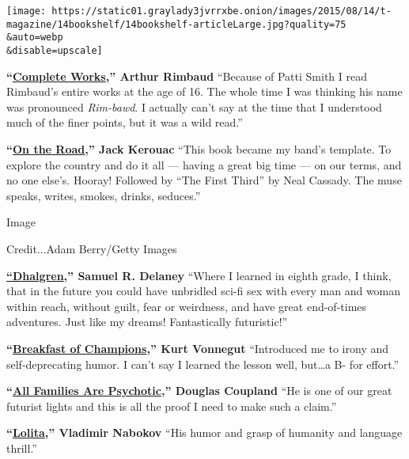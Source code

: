 \texttt{[image: https://static01.graylady3jvrrxbe.onion/images/2015/08/14/t-magazine/14bookshelf/14bookshelf-articleLarge.jpg?quality=75\\\&auto=webp\\\&disable=upscale]}

\textbf{``}\href{http://www.amazon.com/Arthur-Rimbaud-Complete-Works/dp/0061561770}{\textbf{Complete
Works}}\textbf{,'' Arthur Rimbaud} ``Because of Patti Smith I read
Rimbaud's entire works at the age of 16. The whole time I was thinking
his name was pronounced \emph{Rim-bawd}. I actually can't say at the
time that I understood much of the finer points, but it was a wild
read.''

\textbf{``}\href{http://www.amazon.com/Road-Jack-Kerouac/dp/0140283293/ref=sr_1_1?ie=UTF8\&qid=1439577432\&sr=8-1\&keywords=on+the+road+jack+kerouac}{\textbf{On
the Road}}\textbf{,'' Jack Kerouac} ``This book became my band's
template. To explore the country and do it all --- having a great big
time --- on our terms, and no one else's. Hooray! Followed by ``The
First Third'' by Neal Cassady. The muse speaks, writes, smokes, drinks,
seduces.''

Image

Credit...Adam Berry/Getty Images

\href{http://www.amazon.com/Dhalgren-Samuel-R-Delany/dp/0375706682}{\textbf{``Dhalgren}}\textbf{,''
Samuel R. Delaney} ``Where I learned in eighth grade, I think, that in
the future you could have unbridled sci-fi sex with every man and woman
within reach, without guilt, fear or weirdness, and have great
end-of-times adventures. Just like my dreams! Fantastically
futuristic!''

\textbf{``}\href{http://www.amazon.com/Breakfast-Champions-Novel-Kurt-Vonnegut/dp/0385334206/ref=sr_1_1?ie=UTF8\&qid=1439577559\&sr=8-1\&keywords=Breakfast+of+Champions}{\textbf{Breakfast
of Champions}}\textbf{,'' Kurt Vonnegut} ``Introduced me to irony and
self-deprecating humor. I can't say I learned the lesson well,
but\ldots{}a B- for effort.''

\textbf{``}\href{http://www.amazon.com/All-Families-Psychotic-Douglas-Coupland/dp/0007117531/ref=sr_1_1?ie=UTF8\&qid=1439577644\&sr=8-1\&keywords=All+Families+Are+Psychotic}{\textbf{All
Families Are Psychotic}}\textbf{,'' Douglas Coupland} ``He is one of our
great futurist lights and this is all the proof I need to make such a
claim.''

\textbf{``}\href{http://www.amazon.com/Lolita-Vladimir-Nabokov/dp/0679723161/ref=sr_1_1?ie=UTF8\&qid=1439577660\&sr=8-1\&keywords=Lolita}{\textbf{Lolita}}\textbf{,''
Vladimir Nabokov} ``His humor and grasp of humanity and language
thrill.''

